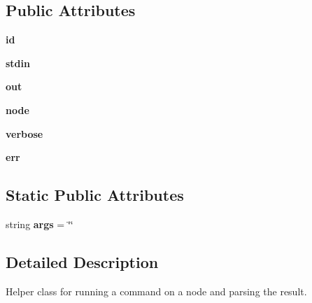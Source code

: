 \subsection*{Public Attributes}
\begin{DoxyCompactItemize}
\item 
\hypertarget{classwlanemanetests_1_1_cmd_a0729e986a24c999ccb476131aa645ad5}{{\bfseries id}}\label{classwlanemanetests_1_1_cmd_a0729e986a24c999ccb476131aa645ad5}

\item 
\hypertarget{classwlanemanetests_1_1_cmd_a2957c29f4038ba406d76646e51945583}{{\bfseries stdin}}\label{classwlanemanetests_1_1_cmd_a2957c29f4038ba406d76646e51945583}

\item 
\hypertarget{classwlanemanetests_1_1_cmd_a2f5641b4556d6d84df3b1c0f3a3cf3e2}{{\bfseries out}}\label{classwlanemanetests_1_1_cmd_a2f5641b4556d6d84df3b1c0f3a3cf3e2}

\item 
\hypertarget{classwlanemanetests_1_1_cmd_a7ef748d8e0ee897ad31dbf4847f89def}{{\bfseries node}}\label{classwlanemanetests_1_1_cmd_a7ef748d8e0ee897ad31dbf4847f89def}

\item 
\hypertarget{classwlanemanetests_1_1_cmd_adad2980a0733d953b097dcb94946e9fa}{{\bfseries verbose}}\label{classwlanemanetests_1_1_cmd_adad2980a0733d953b097dcb94946e9fa}

\item 
\hypertarget{classwlanemanetests_1_1_cmd_aee35a55395cb66e2ad8f51b862a179b4}{{\bfseries err}}\label{classwlanemanetests_1_1_cmd_aee35a55395cb66e2ad8f51b862a179b4}

\end{DoxyCompactItemize}
\subsection*{Static Public Attributes}
\begin{DoxyCompactItemize}
\item 
\hypertarget{classwlanemanetests_1_1_cmd_a4788170395862e1b4e28f7a9274764d4}{string {\bfseries args} = \char`\"{}\char`\"{}}\label{classwlanemanetests_1_1_cmd_a4788170395862e1b4e28f7a9274764d4}

\end{DoxyCompactItemize}


\subsection{Detailed Description}
\begin{DoxyVerb}Helper class for running a command on a node and parsing the result. \end{DoxyVerb}
 

